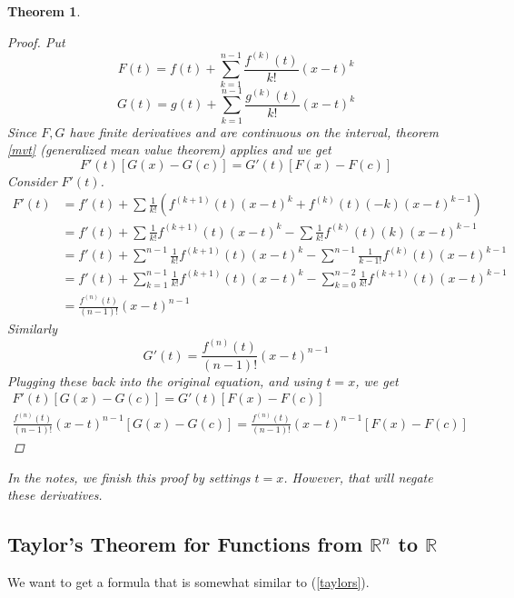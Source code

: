 \documentclass[12pt]{article}
\newcommand{\R}{\mathbb{R}}
\newtheorem{theorem}{Theorem}[section]
\theoremstyle{definition}
\theoremstyle{remark}
\newenvironment{question}[2][QUESTION]{\begin{trivlist}
\item[\hskip \labelsep {\bfseries #1}\hskip \labelsep {\bfseries #2.}]}{\end{trivlist}}
\begin{document}
\begin{theorem}
\begin{proof}
        Put 
        \[F(t)=f(t)+\sum_{k=1}^{n-1}\frac{f^{(k)}(t)}{k!}(x-t)^k\]
        \[G(t)=g(t)+\sum_{k=1}^{n-1}\frac{g^{(k)}(t)}{k!}(x-t)^k\]
        Since $F,G$ have finite derivatives and are continuous on the interval, theorem \ref{mvt} (generalized mean value theorem) applies and we get
        \[ F'(t)[G(x)-G(c)]=G'(t)[F(x)-F(c)] \]
        Consider $F'(t)$.
        \begin{align*}
            F'(t)&=f'(t)+\sum \frac{1}{k!}\left(f^{(k+1)}(t)(x-t)^k+f^{(k)}(t)(-k)(x-t)^{k-1}\right)\tag{By chain and product rule}\\
            &=f'(t)+\sum \frac{1}{k!}f^{(k+1)}(t)(x-t)^k-\sum\frac{1}{k!} f^{(k)}(t)(k)(x-t)^{k-1}\\
            &=f'(t)+\sum^{n-1} \frac{1}{k!}f^{(k+1)}(t)(x-t)^k-\sum^{n-1}\frac{1}{k-1!} f^{(k)}(t)(x-t)^{k-1}\\
            &=f'(t)+\sum^{n-1}_{k=1} \frac{1}{k!}f^{(k+1)}(t)(x-t)^k-\sum^{n-2}_{k=0}\frac{1}{k!} f^{(k+1)}(t)(x-t)^{k-1}\\
            &=\frac{f^{(n)}(t)}{(n-1)!}(x-t)^{n-1}
        \end{align*}
        Similarly
        \[G'(t)=\frac{f^{(n)}(t)}{(n-1)!}(x-t)^{n-1}\]
        Plugging these back into the original equation, and using $t=x$, we get
        \begin{align*}
            F'(t)[G(x)-G(c)]=G'(t)[F(x)-F(c)]\\
            \frac{f^{(n)}(t)}{(n-1)!}(x-t)^{n-1}[G(x)-G(c)]=\frac{f^{(n)}(t)}{(n-1)!}(x-t)^{n-1}[F(x)-F(c)]
        \end{align*}
    \end{proof}
    \begin{question}{7.5}
       In the notes, we finish this proof by settings $t=x$. However, that will negate these derivatives.\vspace{2in} 
    \end{question}
\end{theorem}

\subsection{Taylor's Theorem for Functions from $\R^n$ to $\R$}
We want to get a formula that is somewhat similar to (\ref{taylors}).
\end{document}
